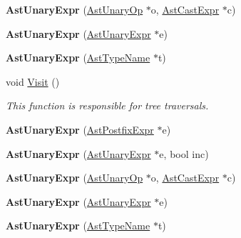 \begin{DoxyCompactItemize}
\item 
\hypertarget{classAstUnaryExpr_ad71de2cd2c65b31e5f5f5fde4e75fc14}{{\bfseries Ast\-Unary\-Expr} (\hyperlink{classAstUnaryOp}{Ast\-Unary\-Op} $\ast$o, \hyperlink{classAstCastExpr}{Ast\-Cast\-Expr} $\ast$c)}\label{classAstUnaryExpr_ad71de2cd2c65b31e5f5f5fde4e75fc14}

\item 
\hypertarget{classAstUnaryExpr_a22b7c004d42c54c96b40de10cc90a07e}{{\bfseries Ast\-Unary\-Expr} (\hyperlink{classAstUnaryExpr}{Ast\-Unary\-Expr} $\ast$e)}\label{classAstUnaryExpr_a22b7c004d42c54c96b40de10cc90a07e}

\item 
\hypertarget{classAstUnaryExpr_a305b745cf1449c3d3dc4e74dcd768ef1}{{\bfseries Ast\-Unary\-Expr} (\hyperlink{classAstTypeName}{Ast\-Type\-Name} $\ast$t)}\label{classAstUnaryExpr_a305b745cf1449c3d3dc4e74dcd768ef1}

\item 
void \hyperlink{classAstUnaryExpr_ae35427088d6f5c889e8e80573a3750fc}{Visit} ()
\begin{DoxyCompactList}\small\item\em This function is responsible for tree traversals. \end{DoxyCompactList}\item 
\hypertarget{classAstUnaryExpr_a7afc6e7c4cf309676aa701656c70453a}{{\bfseries Ast\-Unary\-Expr} (\hyperlink{classAstPostfixExpr}{Ast\-Postfix\-Expr} $\ast$e)}\label{classAstUnaryExpr_a7afc6e7c4cf309676aa701656c70453a}

\item 
\hypertarget{classAstUnaryExpr_a82859566c71d787e29263ff3ba013261}{{\bfseries Ast\-Unary\-Expr} (\hyperlink{classAstUnaryExpr}{Ast\-Unary\-Expr} $\ast$e, bool inc)}\label{classAstUnaryExpr_a82859566c71d787e29263ff3ba013261}

\item 
\hypertarget{classAstUnaryExpr_ad71de2cd2c65b31e5f5f5fde4e75fc14}{{\bfseries Ast\-Unary\-Expr} (\hyperlink{classAstUnaryOp}{Ast\-Unary\-Op} $\ast$o, \hyperlink{classAstCastExpr}{Ast\-Cast\-Expr} $\ast$c)}\label{classAstUnaryExpr_ad71de2cd2c65b31e5f5f5fde4e75fc14}

\item 
\hypertarget{classAstUnaryExpr_a22b7c004d42c54c96b40de10cc90a07e}{{\bfseries Ast\-Unary\-Expr} (\hyperlink{classAstUnaryExpr}{Ast\-Unary\-Expr} $\ast$e)}\label{classAstUnaryExpr_a22b7c004d42c54c96b40de10cc90a07e}

\item 
\hypertarget{classAstUnaryExpr_a305b745cf1449c3d3dc4e74dcd768ef1}{{\bfseries Ast\-Unary\-Expr} (\hyperlink{classAstTypeName}{Ast\-Type\-Name} $\ast$t)}\label{classAstUnaryExpr_a305b745cf1449c3d3dc4e74dcd768ef1}


\end{DoxyCompactItemize}
